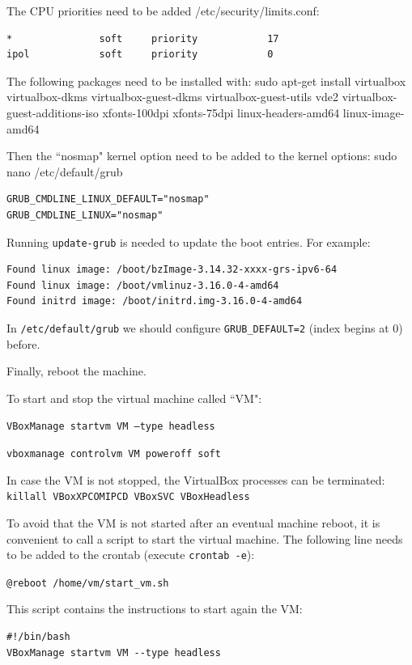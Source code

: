 \documentclass[a4paper,12pt]{article}
\begin{document}
The CPU priorities need to be added /etc/security/limits.conf:
\begin{verbatim}
*               soft     priority            17
ipol            soft     priority            0
\end{verbatim}


The following packages need to be installed with: sudo apt-get install virtualbox virtualbox-dkms virtualbox-guest-dkms virtualbox-guest-utils vde2 virtualbox-guest-additions-iso xfonts-100dpi xfonts-75dpi linux-headers-amd64 linux-image-amd64

Then the ``nosmap" kernel option need to be added to the kernel options: sudo nano /etc/default/grub

\begin{verbatim}
GRUB_CMDLINE_LINUX_DEFAULT="nosmap"
GRUB_CMDLINE_LINUX="nosmap"
\end{verbatim}

Running {\tt update-grub} is needed to update the boot entries. For example:

\begin{verbatim}
Found linux image: /boot/bzImage-3.14.32-xxxx-grs-ipv6-64
Found linux image: /boot/vmlinuz-3.16.0-4-amd64
Found initrd image: /boot/initrd.img-3.16.0-4-amd64
\end{verbatim}

In {\tt /etc/default/grub} we should configure {\tt GRUB\_DEFAULT=2} (index begins at 0) before.

Finally, reboot the machine.

To start and stop the virtual machine called ``VM":

{\tt VBoxManage startvm VM --type headless}

{\tt vboxmanage controlvm VM poweroff soft}

In case the VM is not stopped, the VirtualBox processes can be terminated: {\tt killall VBoxXPCOMIPCD VBoxSVC VBoxHeadless}

To avoid that the VM is not started after an eventual machine reboot, it is convenient to call a script to start the virtual machine. The following line needs to be added to the crontab (execute {\tt crontab -e}):

{\tt @reboot /home/vm/start\_vm.sh}

This script contains the instructions to start again the VM:

\begin{verbatim}
#!/bin/bash
VBoxManage startvm VM --type headless
\end{verbatim}
\end{document}
